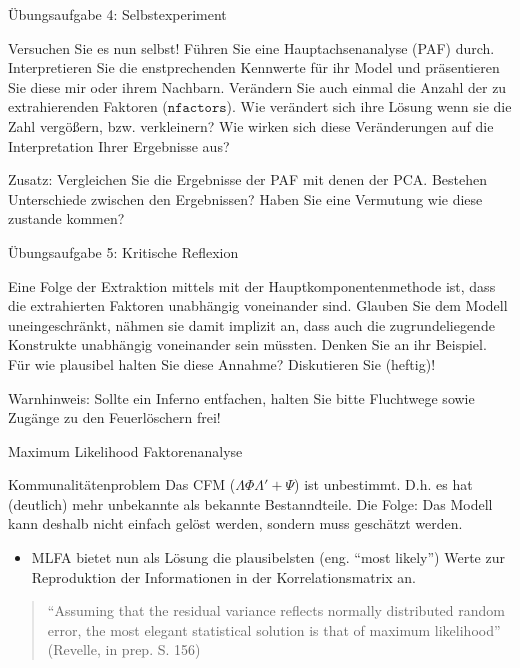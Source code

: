 \documentclass[
  ignorenonframetext,
]{beamer}
\providecommand{\tightlist}{%
  \setlength{\itemsep}{0pt}\setlength{\parskip}{0pt}}
\begin{document}
\begin{frame}{Übungsaufgabe 4: Selbstexperiment}
\protect\hypertarget{uxfcbungsaufgabe-4-selbstexperiment}{}
\begin{example}
Versuchen Sie es nun selbst! Führen Sie eine Hauptachsenanalyse (PAF) durch.
Interpretieren Sie die enstprechenden Kennwerte für ihr Model und präsentieren
Sie diese mir oder ihrem Nachbarn. Verändern Sie auch einmal die Anzahl der zu
extrahierenden Faktoren ($\texttt{nfactors}$). Wie verändert sich ihre Lösung
wenn sie die Zahl vergößern, bzw. verkleinern? Wie wirken sich diese
Veränderungen auf die Interpretation Ihrer Ergebnisse aus?
\end{example}

Zusatz: Vergleichen Sie die Ergebnisse der PAF mit denen der PCA.
Bestehen Unterschiede zwischen den Ergebnissen? Haben Sie eine Vermutung
wie diese zustande kommen?
\end{frame}

\begin{frame}{Übungsaufgabe 5: Kritische Reflexion}
\protect\hypertarget{uxfcbungsaufgabe-5-kritische-reflexion}{}
\begin{example}
Eine Folge der Extraktion mittels mit der Hauptkomponentenmethode ist, dass die
extrahierten Faktoren unabhängig voneinander sind. Glauben Sie dem Modell
uneingeschränkt, nähmen sie damit implizit an, dass auch die zugrundeliegende
Konstrukte unabhängig voneinander sein müssten. Denken Sie an ihr Beispiel. Für
wie plausibel halten Sie diese Annahme? Diskutieren Sie (heftig)! 
\end{example}

Warnhinweis: Sollte ein Inferno entfachen, halten Sie bitte Fluchtwege
sowie Zugänge zu den Feuerlöschern frei!
\end{frame}

\begin{frame}{Maximum Likelihood Faktorenanalyse}
\protect\hypertarget{maximum-likelihood-faktorenanalyse}{}
\begin{alertblock}{Kommunalitätenproblem}
Das CFM ($\Lambda \Phi \Lambda' + \Psi$) ist unbestimmt. D.h. es hat (deutlich)
mehr unbekannte als bekannte Bestanndteile. Die Folge: Das Modell kann deshalb
nicht einfach gelöst werden, sondern muss geschätzt werden.
\end{alertblock}

\begin{itemize}
\tightlist
\item
  MLFA bietet nun als Lösung die plausibelsten (eng. ``most likely'')
  Werte zur Reproduktion der Informationen in der Korrelationsmatrix an.
\end{itemize}

\begin{quote}
``Assuming that the residual variance reflects normally distributed
random error, the most elegant statistical solution is that of maximum
likelihood'' (Revelle, in prep. S. 156)
\end{quote}
\end{frame}
\end{document}
